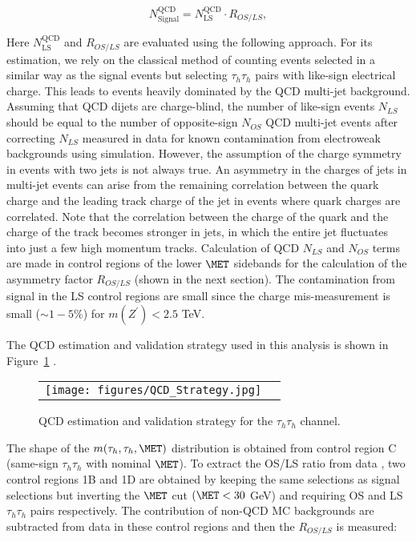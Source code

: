 \begin{equation}                                                                                                                                                      
N_{\textrm{Signal}}^{\textrm{QCD}} = N_{\textrm{LS}}^{\textrm{QCD}} \cdot R_{OS/LS},
\end{equation}
   
Here $N_{\textrm{LS}}^{\textrm{QCD}}$ and $R_{OS/LS}$ are evaluated using the following approach. For its estimation, we rely on the classical method of counting events selected in a similar way as the signal events but selecting $\tau_{h}\tau_{h}$ pairs with like-sign electrical charge. This leads to events heavily dominated by the QCD multi-jet background. Assuming that QCD dijets are charge-blind, the number of like-sign events $N_{LS}$ should be equal to the number of opposite-sign $N_{OS}$ QCD multi-jet events after correcting $N_{LS}$ measured in data for known contamination from electroweak backgrounds using simulation. However, the assumption of the charge symmetry in events with two jets is not always true. An asymmetry in the charges of jets in multi-jet events can arise from the remaining correlation
between the quark charge and the leading track charge of the jet in events where quark charges are correlated. 
Note that the correlation between the charge of the quark and the charge of the track
becomes stronger in jets, in which the entire jet fluctuates into just a few high momentum tracks. Calculation of QCD $N_{LS}$ and $N_{OS}$ terms are made in control regions of the lower $\MET$ sidebands for the calculation of the asymmetry factor $R_{OS/LS}$ (shown in the next section). 
The contamination from signal in the LS control regions are small since the charge mis-measurement is small ($\sim 1-5\%$) for $m(Z^{\prime}) < 2.5$ TeV. 

The QCD estimation and validation strategy used in this analysis is shown in Figure~\ref{fig:qcd} .    

 \begin{figure}[tbh!]
     \centering
     \begin{tabular}{cc}
       \texttt{[image: figures/QCD\_Strategy.jpg]}
     \end{tabular}
     \caption{QCD estimation and validation strategy for the $\tau_{h}\tau_{h}$ channel.}
    \label{fig:qcd}
   \end{figure}


The shape of the $m(\tau_{h},\tau_{h},\MET)$ distribution is obtained from control region C (same-sign $\tau_{h}\tau_{h}$ with nominal $\MET$). To extract the OS/LS ratio from data , two control regions 1B and 1D are obtained by keeping the same selections as signal selections but inverting the $\MET$ cut $(\MET < 30$ GeV) and requiring OS and LS $\tau_{h}\tau_{h}$ pairs respectively. The contribution of non-QCD MC backgrounds are subtracted from data in these control regions and then the $R_{OS/LS}$ is measured:

